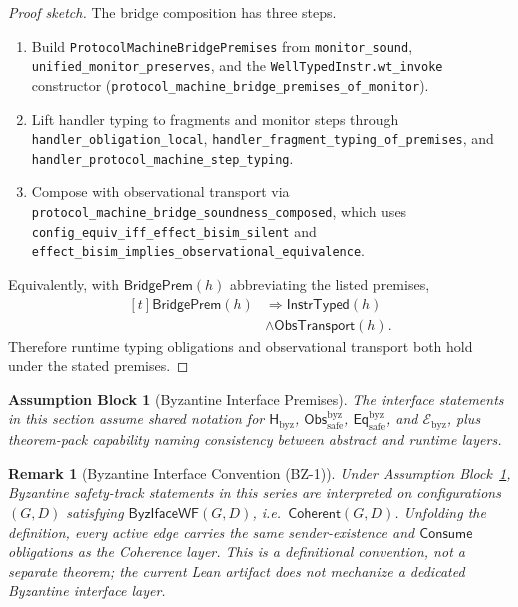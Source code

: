\documentclass[a4paper,10pt,twocolumn,english]{article}
\numberwithin{equation}{section}
\theoremstyle{paperdef}
\theoremstyle{paperplain}
\theoremstyle{paperdef}
\newtheorem{assumption}{Assumption Block}[section]
\theoremstyle{paperremark}
\newtheorem{remark}[definition]{Remark}
\newcommand{\Coherent}{\ensuremath{\mathsf{Coherent}}}
\newcommand{\Consume}{\ensuremath{\mathsf{Consume}}}
\newcommand{\Hbyz}{\ensuremath{\mathsf{H}_{\mathrm{byz}}}}
\newcommand{\Obssafe}{\ensuremath{\mathsf{Obs}_{\mathrm{safe}}^{\mathrm{byz}}}}
\newcommand{\Eqsafe}{\ensuremath{\mathsf{Eq}_{\mathrm{safe}}^{\mathrm{byz}}}}
\newcommand{\Ebyz}{\ensuremath{\mathcal{E}_{\mathrm{byz}}}}
\newcommand{\ByzIfaceWF}{\ensuremath{\mathsf{ByzIfaceWF}}}
\begin{document}
\begin{proof}[Proof sketch]
	The bridge composition has three steps.
	\begin{enumerate}
		\item Build \texttt{ProtocolMachineBridgePremises} from \nolinkurl{monitor_sound}, \nolinkurl{unified_monitor_preserves}, and the \nolinkurl{WellTypedInstr.wt_invoke} constructor (\nolinkurl{protocol_machine_bridge_premises_of_monitor}).
		\item Lift handler typing to fragments and monitor steps through \nolinkurl{handler_obligation_local}, \nolinkurl{handler_fragment_typing_of_premises}, and \nolinkurl{handler_protocol_machine_step_typing}.
		\item Compose with observational transport via \nolinkurl{protocol_machine_bridge_soundness_composed}, which uses \nolinkurl{config_equiv_iff_effect_bisim_silent} and \nolinkurl{effect_bisim_implies_observational_equivalence}.
	\end{enumerate}
	Equivalently, with $\mathsf{BridgePrem}(h)$ abbreviating the listed premises,
	\[
		\begin{aligned}[t]
			\mathsf{BridgePrem}(h)
			 & \Longrightarrow \mathsf{InstrTyped}(h) \\
			 & \land \mathsf{ObsTransport}(h).
		\end{aligned}
	\]
	Therefore runtime typing obligations and observational transport both hold under the stated premises.
\end{proof}

\begin{assumption}[Byzantine Interface Premises]
	\label{assump:p1-byzantine}
	The interface statements in this section assume shared notation for \Hbyz, \Obssafe, \Eqsafe, and \Ebyz, plus theorem-pack capability naming consistency between abstract and runtime layers.
\end{assumption}

\begin{remark}[Byzantine Interface Convention (BZ-1)]
	\label{thm:bz1}
	Under Assumption Block~\ref{assump:p1-byzantine}, Byzantine safety-track statements in this series are interpreted on configurations $(G,D)$ satisfying $\ByzIfaceWF(G,D)$, i.e.\ $\Coherent(G,D)$. Unfolding the definition, every active edge carries the same sender-existence and $\Consume$ obligations as the Coherence layer. This is a definitional convention, not a separate theorem; the current Lean artifact does not mechanize a dedicated Byzantine interface layer.
\end{remark}
\end{document}
